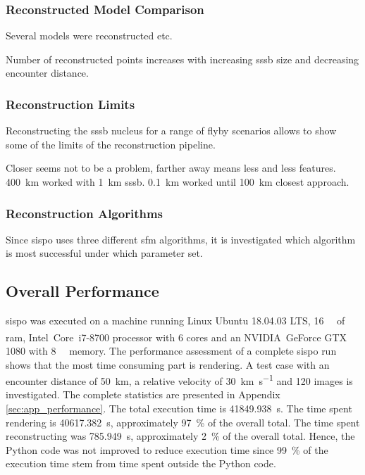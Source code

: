 \subsubsection{Reconstructed Model Comparison}
Several models were reconstructed etc.

Number of reconstructed points increases with increasing \gls{sssb} size and decreasing encounter distance.


\subsubsection{Reconstruction Limits}
Reconstructing the \gls{sssb} nucleus for a range of flyby scenarios allows to show some of the limits of the reconstruction pipeline.

Closer seems not to be a problem, farther away means less and less features. \SI{400}{\kilo\meter} worked with \SI{1}{\kilo\meter} \gls{sssb}. 
\SI{0.1}{\kilo\meter} worked until \SI{100}{\kilo\meter} closest approach.


\subsubsection{Reconstruction Algorithms}
Since \gls{sispo} uses three different \gls{sfm} algorithms, it is investigated which algorithm is most successful under which parameter set.

\subsection{Overall Performance}
\gls{sispo} was executed on a machine running Linux Ubuntu 18.04.03 LTS, \SI{16}{\giga\byte} of \gls{ram}, Intel\textsuperscript{\textregistered}~Core\texttrademark~i7-8700 processor with \SI{6}{} cores and an NVIDIA\textsuperscript{\textregistered}~GeForce GTX 1080 with \SI{8}{\giga\byte} memory. The performance assessment of a complete \gls{sispo} run shows that the most time consuming part is rendering. 
A test case with an encounter distance of \SI{50}{\kilo\meter}, a relative velocity of \SI{30}{\kilo\meter\per\second} and \SI{120}{} images is investigated. The complete statistics are presented in Appendix \ref{sec:app_performance}. The total execution time is \SI{41849.938}{\second}. The time spent rendering is \SI{40617.382}{\second}, approximately \SI{97}{\percent} of the overall total. The time spent reconstructing was \SI{785.949}{\second}, approximately \SI{2}{\percent} of the overall total. Hence, the Python code was not improved to reduce execution time since \SI{99}{\percent} of the execution time stem from time spent outside the Python code.